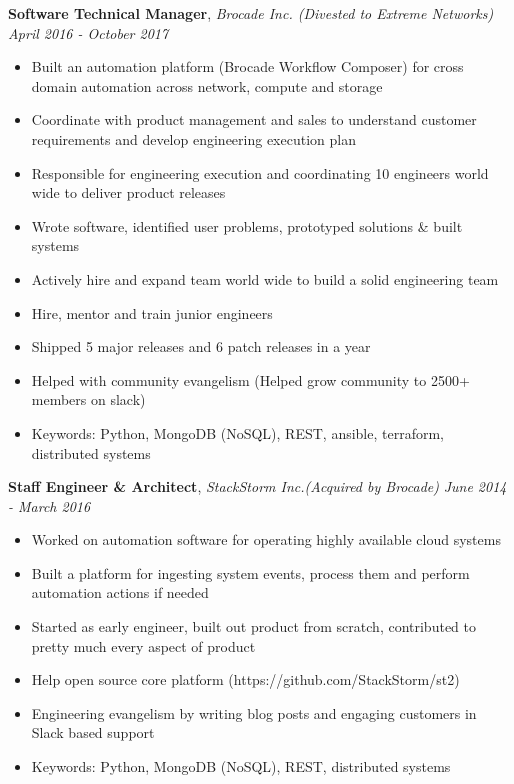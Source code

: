 \documentclass[9pt]{article}
\newenvironment{changemargin}[2]{%
  \begin{list}{}{%
    \setlength{\topsep}{0pt}%
    \setlength{\leftmargin}{#1}%
    \setlength{\rightmargin}{#2}%
    \setlength{\listparindent}{\parindent}%
    \setlength{\itemindent}{\parindent}%
    \setlength{\parsep}{\parskip}%
  }%
  \item[]}{\end{list}
}
\newenvironment{body} {
	\vspace*{-16pt}
	\begin{changemargin}{-0.25in}{-0.5in}
  }
	{\end{changemargin}
}
\begin{document}
\begin{body}
    \textbf{Software Technical Manager}, \emph{Brocade Inc. (Divested to Extreme Networks)} \hfill \emph{April 2016 - October 2017}\\
    \begin{itemize} \itemsep -0pt  %
    \item Built an automation platform (Brocade Workflow Composer) for cross domain automation across network, compute and storage
    \item Coordinate with product management and sales to understand customer requirements and develop engineering execution plan
    \item Responsible for engineering execution and coordinating 10 engineers world wide to deliver product releases
    \item Wrote software, identified user problems, prototyped solutions \& built systems
    \item Actively hire and expand team world wide to build a solid engineering team
    \item Hire, mentor and train junior engineers
    \item Shipped 5 major releases and 6 patch releases in a year
    \item Helped with community evangelism (Helped grow community to 2500+ members on slack)
    \item Keywords: Python, MongoDB (NoSQL), REST, ansible, terraform, distributed systems
    \end{itemize}

    \textbf{Staff Engineer \& Architect}, \emph{StackStorm Inc.(Acquired by Brocade)} \hfill \emph{June 2014 - March 2016}\\
    \begin{itemize} \itemsep -0pt  %
    \item Worked on automation software for operating highly available cloud systems
    \item Built a platform for ingesting system events, process them and perform
    automation actions if needed
    \item Started as early engineer, built out product from scratch, contributed to pretty much every aspect of product
    \item Help open source core platform (https://github.com/StackStorm/st2)
    \item Engineering evangelism by writing blog posts and engaging customers in Slack based support
    \item Keywords: Python, MongoDB (NoSQL), REST, distributed systems
    \end{itemize}


\end{body}
\end{document}
